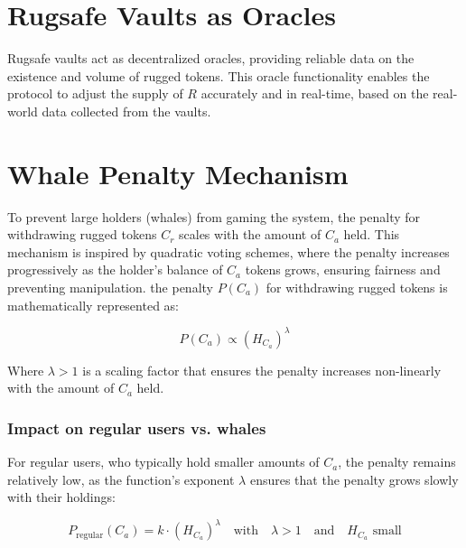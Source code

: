 \documentclass{article}
\begin{document}
\section{Rugsafe Vaults as Oracles}
Rugsafe vaults act as decentralized oracles, providing reliable data on the existence and volume of rugged tokens. This oracle functionality enables the protocol to adjust the supply of $R$ accurately and in real-time, based on the real-world data collected from the vaults.

























\section{Whale Penalty Mechanism}
To prevent large holders (whales) from gaming the system, the penalty for withdrawing rugged tokens $C_r$ scales with the amount of $C_a$ held. This mechanism is inspired by quadratic voting schemes, where the penalty increases progressively as the holder's balance of $C_a$ tokens grows, ensuring fairness and preventing manipulation. the penalty $P(C_a)$ for withdrawing rugged tokens is mathematically represented as:


\[
P(C_a) \propto \left(H_{C_a}\right)^\lambda
\]

Where $\lambda > 1$ is a scaling factor that ensures the penalty increases non-linearly with the amount of $C_a$ held.

\subsubsection{Impact on regular users vs. whales}

For regular users, who typically hold smaller amounts of $C_a$, the penalty remains relatively low, as the function’s exponent $\lambda$ ensures that the penalty grows slowly with their holdings:

\[
P_{\text{regular}}(C_a) = k \cdot \left(H_{C_a}\right)^\lambda \quad \text{with} \quad \lambda > 1 \quad \text{and} \quad H_{C_a} \text{ small}
\]
\end{document}
